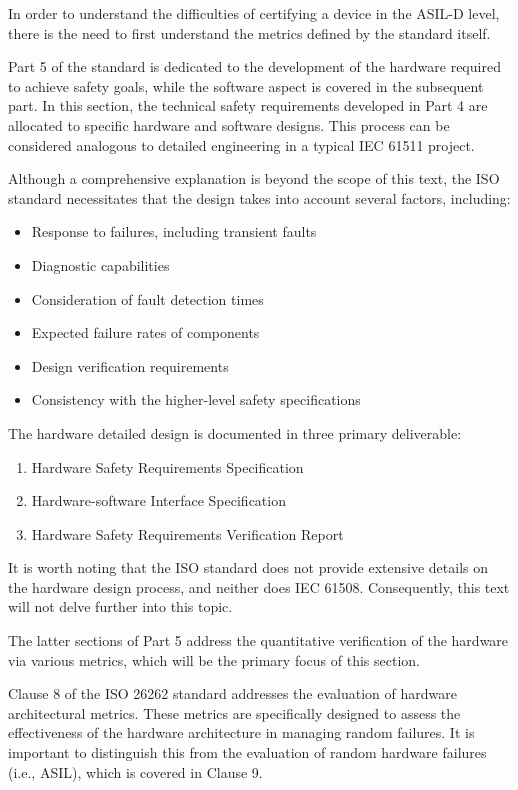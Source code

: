 \documentclass[./dissertation.tex]{subfiles}
\begin{document}
In order to understand the difficulties of certifying a device in the ASIL-D level, there is the need to first understand the metrics defined by the standard itself.

Part 5 of the standard is dedicated to the development of the hardware required to achieve safety goals, while the software aspect is covered in the subsequent part. In this section, the technical safety requirements developed in Part 4 are allocated to specific hardware and software designs. This process can be considered analogous to detailed engineering in a typical IEC 61511 project.

Although a comprehensive explanation is beyond the scope of this text, the ISO standard necessitates that the design takes into account several factors, including:

\begin{itemize}
\item Response to failures, including transient faults
\item Diagnostic capabilities
\item Consideration of fault detection times
\item Expected failure rates of components
\item Design verification requirements
\item Consistency with the higher-level safety specifications
\end{itemize}

The hardware detailed design is documented in three primary deliverable:

\begin{enumerate}
\item Hardware Safety Requirements Specification
\item Hardware-software Interface Specification
\item Hardware Safety Requirements Verification Report
\end{enumerate}

It is worth noting that the ISO standard does not provide extensive details on the hardware design process, and neither does IEC 61508. Consequently, this text will not delve further into this topic.

The latter sections of Part 5 address the quantitative verification of the hardware via various metrics, which will be the primary focus of this section.

Clause 8 of the ISO 26262 standard addresses the evaluation of hardware architectural metrics. These metrics are specifically designed to assess the effectiveness of the hardware architecture in managing random failures. It is important to distinguish this from the evaluation of random hardware failures (i.e., ASIL), which is covered in Clause 9.
\end{document}
